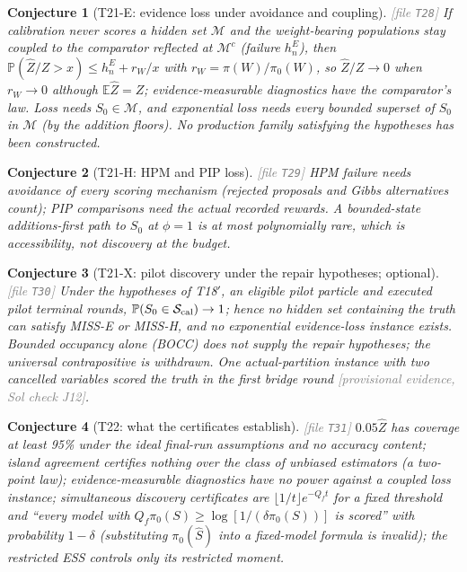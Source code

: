 \documentclass[11pt,a4paper]{article}
\theoremstyle{plain}
\newtheorem{conjecture}{Conjecture}[section]
\theoremstyle{definition}
\theoremstyle{remark}
\newcommand{\E}{\mathbb{E}}
\newcommand{\Prob}{\mathbb{P}}
\newcommand{\calS}{\mathcal{S}}
\newcommand{\calM}{\mathcal{M}}
\newcommand{\Sz}{S_0}
\newcommand{\Shat}{\widehat S}
\newcommand{\Zhat}{\widehat Z}
\newcommand{\pizero}{\pi_0}
\newcommand{\Qf}{Q_{f}}
\newcommand{\provisional}[1]{\textcolor{gray}{[provisional evidence, Sol check #1]}}
\newcommand{\thfile}[1]{\textcolor{gray}{\footnotesize[file \texttt{#1}]}}
\begin{document}
\begin{conjecture}[T21-E: evidence loss under avoidance and coupling]\thfile{T28}
If calibration never scores a hidden set $\calM$ and the weight-bearing populations stay coupled to the comparator reflected at $\calM^c$ (failure $h_n^E$), then $\Prob(\Zhat/Z>x)\le h_n^E+r_W/x$ with $r_W=\pi(W)/\pizero(W)$, so $\Zhat/Z\to0$ when $r_W\to0$ although $\E\Zhat=Z$; evidence-measurable diagnostics have the comparator's law. Loss needs $\Sz\in\calM$, and exponential loss needs every bounded superset of $\Sz$ in $\calM$ (by the addition floors). No production family satisfying the hypotheses has been constructed.
\end{conjecture}

\begin{conjecture}[T21-H: HPM and PIP loss]\thfile{T29}
HPM failure needs avoidance of \emph{every} scoring mechanism (rejected proposals and Gibbs alternatives count); PIP comparisons need the actual recorded rewards. A bounded-state additions-first path to $\Sz$ at $\phi=1$ is at most polynomially rare, which is accessibility, not discovery at the budget.
\end{conjecture}

\begin{conjecture}[T21-X: pilot discovery under the repair hypotheses; optional]\thfile{T30}
Under the hypotheses of T18$'$, an eligible pilot particle and executed pilot terminal rounds, $\Prob(\Sz\in\calS_{\rm cal})\to1$; hence no hidden set containing the truth can satisfy MISS-E or MISS-H, and no exponential evidence-loss instance exists. Bounded occupancy alone (BOCC) does not supply the repair hypotheses; the universal contrapositive is withdrawn. One actual-partition instance with two cancelled variables scored the truth in the first bridge round \provisional{J12}.
\end{conjecture}

\begin{conjecture}[T22: what the certificates establish]\thfile{T31}
$0.05\Zhat$ has coverage at least 95\% under the ideal final-run assumptions and no accuracy content; island agreement certifies nothing over the class of unbiased estimators (a two-point law); evidence-measurable diagnostics have no power against a coupled loss instance; simultaneous discovery certificates are $\lfloor1/t\rfloor e^{-\Qf t}$ for a fixed threshold and ``every model with $\Qf\pizero(S)\ge\log[1/(\delta\pizero(S))]$ is scored'' with probability $1-\delta$ (substituting $\pizero(\Shat)$ into a fixed-model formula is invalid); the restricted ESS controls only its restricted moment.
\end{conjecture}
\end{document}
